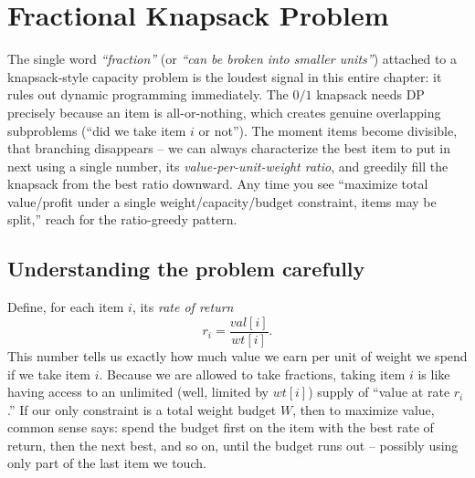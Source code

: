 \section{Fractional Knapsack Problem}
\label{sec:fractional-knapsack}


\begin{patternbox}
The single word \emph{``fraction''} (or \emph{``can be broken into
smaller units''}) attached to a knapsack-style capacity problem is the
loudest signal in this entire chapter: it rules out dynamic programming
immediately. The $0/1$ knapsack needs DP precisely because an item is
all-or-nothing, which creates genuine overlapping subproblems (``did we take
item $i$ or not''). The moment items become divisible, that branching
disappears -- we can always characterize the best item to put in next using a
single number, its \emph{value-per-unit-weight ratio}, and greedily fill the
knapsack from the best ratio downward. Any time you see ``maximize total
value/profit under a single weight/capacity/budget constraint, items may be
split,'' reach for the ratio-greedy pattern.
\end{patternbox}

\subsection*{Understanding the problem carefully}

Define, for each item $i$, its \emph{rate of return}
\[
  r_i = \frac{\textit{val}[i]}{\textit{wt}[i]}.
\]
This number tells us exactly how much value we earn per unit of weight we
spend if we take item $i$. Because we are allowed to take fractions, taking
item $i$ is like having access to an unlimited (well, limited by
$\textit{wt}[i]$) supply of ``value at rate $r_i$.'' If our only constraint is
a total weight budget $W$, then to maximize value, common sense says: spend
the budget first on the item with the best rate of return, then the next
best, and so on, until the budget runs out -- possibly using only part of the
last item we touch.

